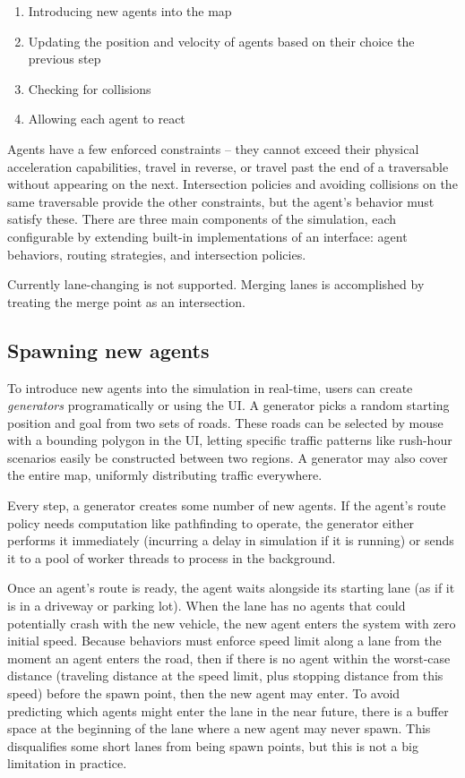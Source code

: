 \documentclass[letterpaper, 10 pt, conference]{ieeeconf}  %
\begin{document}
\begin{enumerate}
  \item Introducing new agents into the map
  \item Updating the position and velocity of agents based on their choice the
        previous step
  \item Checking for collisions
  \item Allowing each agent to react
\end{enumerate}

Agents have a few enforced constraints -- they cannot exceed their physical
acceleration capabilities, travel in reverse, or travel past the end of a
traversable without appearing on the next. Intersection policies and avoiding
collisions on the same traversable provide the other constraints, but the
agent's behavior must satisfy these. There are three main components of the
simulation, each configurable by extending built-in implementations of an
interface: agent behaviors, routing strategies, and intersection policies.

Currently lane-changing is not supported. Merging lanes is accomplished by
treating the merge point as an intersection.

\subsection{Spawning new agents}

To introduce new agents into the simulation in real-time, users can create
\emph{generators} programatically or using the UI. A generator picks a random
starting position and goal from two sets of roads. These roads can be selected
by mouse with a bounding polygon in the UI, letting specific traffic patterns
like rush-hour scenarios easily be constructed between two regions. A generator
may also cover the entire map, uniformly distributing traffic everywhere.

Every step, a generator creates some number of new agents. If the agent's route
policy needs computation like pathfinding to operate, the generator either
performs it immediately (incurring a delay in simulation if it is running) or
sends it to a pool of worker threads to process in the background.

Once an agent's route is ready, the agent waits alongside its starting lane (as
if it is in a driveway or parking lot). When the lane has no agents that could
potentially crash with the new vehicle, the new agent enters the system with
zero initial speed.  Because behaviors must enforce speed limit along a lane 
from the moment an agent enters the road, then if there is no agent within the
worst-case distance (traveling distance at the speed limit, plus stopping
distance from this speed) before the spawn point, then the new agent may enter.
To avoid predicting which agents might enter the lane in the near future, there
is a buffer space at the beginning of the lane where a new agent may never
spawn. This disqualifies some short lanes from being spawn points, but this is
not a big limitation in practice.
\end{document}
